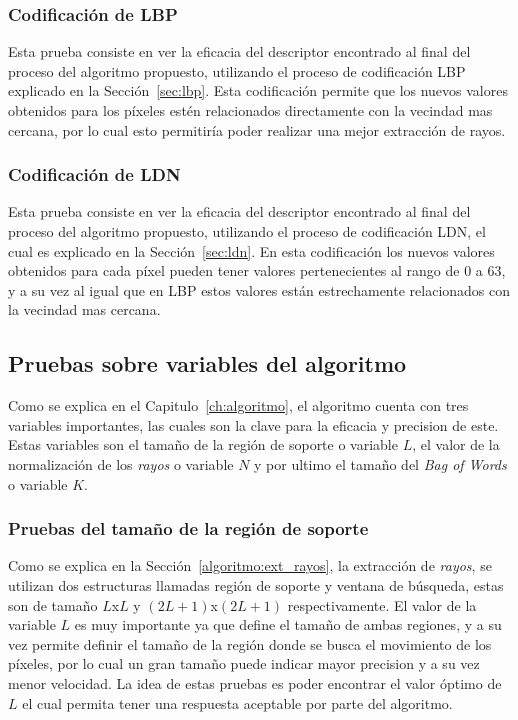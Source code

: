	\subsubsection{Codificación de LBP}
	Esta prueba consiste en ver la eficacia del descriptor encontrado al final del proceso del algoritmo propuesto, utilizando el proceso de codificación LBP explicado en la Sección~\ref{sec:lbp}. Esta codificación permite que los nuevos valores obtenidos para los píxeles estén relacionados directamente con la vecindad mas cercana, por lo cual esto permitiría poder realizar una mejor extracción de rayos.
	
	\subsubsection{Codificación de LDN}
	Esta prueba consiste en ver la eficacia del descriptor encontrado al final del proceso del algoritmo propuesto, utilizando el proceso de codificación LDN, el cual es explicado en la Sección~\ref{sec:ldn}. En esta codificación los nuevos valores obtenidos para cada píxel pueden tener valores pertenecientes al rango de 0 a 63, y a su vez al igual que en LBP estos valores están estrechamente relacionados con la vecindad mas cercana.

\subsection{Pruebas sobre variables del algoritmo}
\label{exp:var}
Como se explica en el Capitulo~\ref{ch:algoritmo}, el algoritmo cuenta con tres variables importantes, las cuales son la clave para la eficacia y precision de este. Estas variables son el tamaño de la región de soporte o variable $L$, el valor de la normalización de los \textit{rayos} o variable $N$ y por ultimo el tamaño del \textit{Bag of Words} o variable $K$.

	\subsubsection{Pruebas del tamaño de la región de soporte}
	Como se explica en la Sección~\ref{algoritmo:ext_rayos}, la extracción de \textit{rayos}, se utilizan dos estructuras llamadas región de soporte y ventana de búsqueda, estas son de tamaño $L$x$L$ y $(2L+1)$x$(2L+1)$ respectivamente. El valor de la variable $L$ es muy importante ya que define el tamaño de ambas regiones, y a su vez permite definir el tamaño de la región donde se busca el movimiento de los píxeles, por lo cual un gran tamaño puede indicar mayor precision y a su vez menor velocidad. La idea de estas pruebas es poder encontrar el valor óptimo de $L$ el cual permita tener una respuesta aceptable por parte del algoritmo. 

